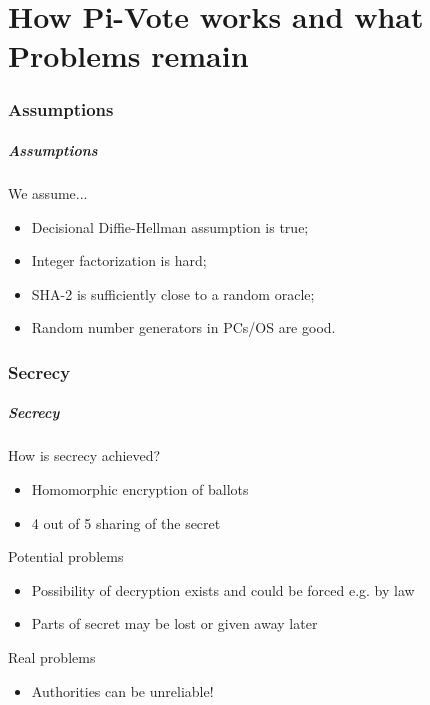 \documentclass[aspectratio=1610, compress, bigger]{beamer}
\begin{document}
\part[Part 2]{How Pi-Vote works and what Problems remain}

\frame[plain]{\partpage}

\section{Assumptions}
\begin{frame}\frametitle{Assumptions}

\begin{block}{We assume...}
\begin{itemize}
\item Decisional Diffie-Hellman assumption is true;
\item Integer factorization is hard;
\item SHA-2 is sufficiently close to a random oracle;
\item Random number generators in PCs/OS are good.
\end{itemize}
\end{block}

\end{frame}

\section{Secrecy}
\begin{frame}\frametitle{Secrecy}

\begin{block}{How is secrecy achieved?}
\begin{itemize}
\item Homomorphic encryption of ballots
\item 4 out of 5 sharing of the secret
\end{itemize}
\end{block}

\pause

\begin{alertblock}{Potential problems}
\begin{itemize}
\item Possibility of decryption exists and could be forced e.g. by law
\item Parts of secret may be lost or given away later
\end{itemize}
\end{alertblock}

\pause

\begin{alertblock}{Real problems}
\begin{itemize}
\item Authorities can be unreliable!
\end{itemize}
\end{alertblock}

\end{frame}
\end{document}
